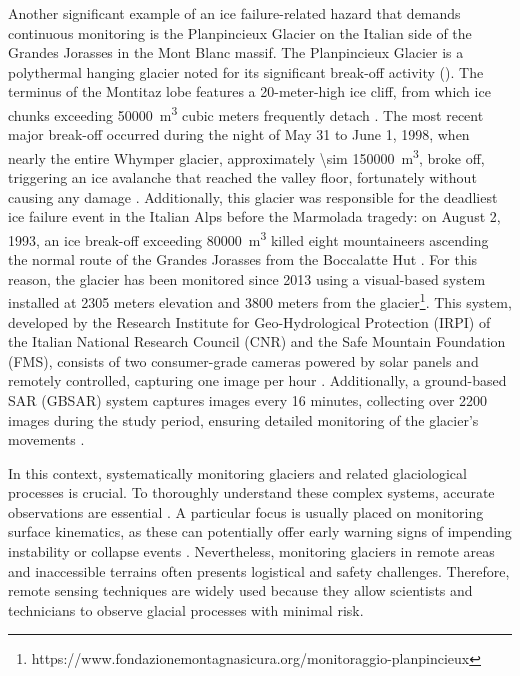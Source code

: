 Another significant example of an ice failure-related hazard that demands continuous monitoring is the Planpincieux Glacier on the Italian side of the Grandes Jorasses in the Mont Blanc massif. 
The Planpincieux Glacier is a polythermal hanging glacier noted for its significant break-off activity ().
The terminus of the Montitaz lobe features a 20-meter-high ice cliff, from which ice chunks exceeding \qty{50000}{\cubic\meter}  cubic meters frequently detach \cite{Giordan2020a}. 
The most recent major break-off occurred during the night of May 31 to June 1, 1998, when nearly the entire Whymper glacier, approximately \SI{\sim 150000}{\cubic\meter}, broke off, triggering an ice avalanche that reached the valley floor, fortunately without causing any damage \cite{Faillettaz2016, chiarle2023}. 
Additionally, this glacier was responsible for the deadliest ice failure event in the Italian Alps before the Marmolada tragedy: on August 2, 1993, an ice break-off exceeding \qty{80000}{\cubic\meter} killed eight mountaineers ascending the normal route of the Grandes Jorasses from the Boccalatte Hut \cite{Faillettaz2016, chiarle2023}.
For this reason, the glacier has been monitored since 2013 using a visual-based system installed at 2305 meters elevation and 3800 meters from the glacier\footnote{https://www.fondazionemontagnasicura.org/monitoraggio-planpincieux}. 
This system, developed by the Research Institute for Geo-Hydrological Protection (IRPI) of the Italian National Research Council (CNR) and the Safe Mountain Foundation (FMS), consists of two consumer-grade cameras powered by solar panels and remotely controlled, capturing one image per hour \cite{Dematteis2018, Giordan2020a}.
Additionally, a ground-based SAR (GBSAR) system captures images every 16 minutes, collecting over 2200 images during the study period, ensuring detailed monitoring of the glacier's movements \cite{Dematteis2018}.

In this context, systematically monitoring glaciers and related glaciological processes is crucial.
To thoroughly understand these complex systems, accurate observations are essential \citep{Kaab2005}.
A particular focus is usually placed on monitoring surface kinematics, as these can potentially offer early warning signs of impending instability or collapse events \citep{Faillettaz2015, Giordan2020a}.
Nevertheless, monitoring glaciers in remote areas and inaccessible terrains often presents logistical and safety challenges.
Therefore, remote sensing techniques are widely used because they allow scientists and technicians to observe glacial processes with minimal risk. 

